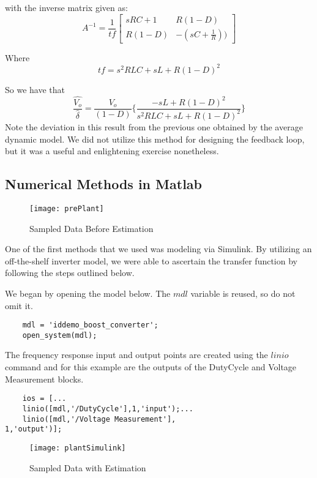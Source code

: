 with the inverse matrix given as:
\begin{equation}
A^{-1} = \frac{1}{tf}\begin{bmatrix}
sRC + 1 & R(1-D) \\ 
R(1-D) & -(sC+\frac{1}{R})) 
\end{bmatrix}
\end{equation}

Where
\begin{equation}
tf = s^2RLC + sL + R(1-D)^2
\end{equation}

So we have that 
\begin{equation}
\frac{\hat{V_o}}{\hat{\delta}} = \frac{V_o}{(1-D)} \bigg\{\frac{-sL + R(1-D)^2}{s^2RLC + sL + R(1-D)^2}\bigg\}
\end{equation}
Note the deviation in this result from the previous one obtained by the average dynamic model. We did not utilize this method for designing the feedback loop, but it was a useful and enlightening exercise nonetheless.

\subsection{Numerical Methods in Matlab}

\begin{figure}[htbp]
\begin{center}
\texttt{[image: prePlant]}
\caption{Sampled Data Before Estimation}
\label{prePlant}
\end{center}
\end{figure}
One of the first methods that we used was modeling via Simulink. By utilizing an off-the-shelf inverter model, we were able to ascertain the transfer function by following the steps outlined below. 

We began by opening the model below. The $mdl$ variable is reused, so do not omit it.
\begin{verbatim}
	mdl = 'iddemo_boost_converter';
	open_system(mdl);
\end{verbatim}
The frequency response input and output points are created using the $linio$ command and for this example are the outputs of the DutyCycle and Voltage Measurement blocks.
\begin{verbatim}
	ios = [...
	linio([mdl,'/DutyCycle'],1,'input');...
	linio([mdl,'/Voltage Measurement'],
1,'output')];
\end{verbatim}

\begin{figure}[htbp]
\begin{center}
\texttt{[image: plantSimulink]}
\caption{Sampled Data with Estimation}
\label{plantSimulink}
\end{center}
\end{figure}

